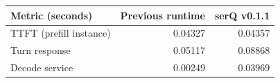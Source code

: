 \begin{center}\small
\begin{tabular}{@{}lrr@{}}
\toprule
Metric (seconds) & Previous runtime & serQ v0.1.1 \\
\midrule
TTFT (prefill instance) & 0.04327 & 0.04357 \\
Turn response & 0.05117 & 0.08868 \\
Decode service & 0.00249 & 0.03969 \\
\bottomrule
\end{tabular}
\end{center}
